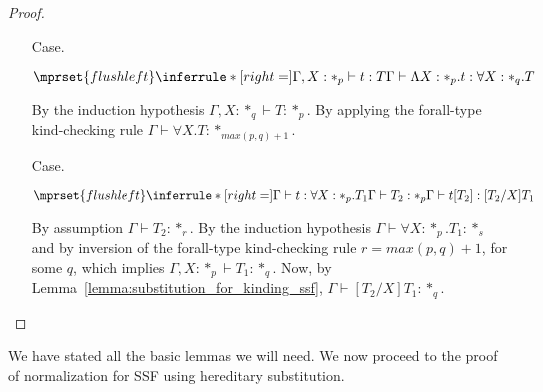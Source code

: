 \begin{proof}
\begin{itemize}
\item[Case.] \ \\
  \begin{center}
    \begin{math}
      $$\mprset{flushleft}
      \inferrule* [right=] {
        \Gamma, X : *_p \vdash t : T
      }{\Gamma \vdash \Lambda X:*_p.t:\forall X : *_q.T}
    \end{math}
  \end{center}
  By the induction hypothesis $\Gamma,X:*_q \vdash T:*_p$.  By applying
  the forall-type kind-checking rule $\Gamma \vdash \forall X.T:*_{max(p,q)+1}$.
  
\item[Case.] \ \\
  \begin{center}
    \begin{math}
      $$\mprset{flushleft}
      \inferrule* [right=] {
        \Gamma \vdash t:\forall X:*_p.T_1
        \\
        \Gamma \vdash T_2:*_p
      }{\Gamma \vdash t[T_2]: [T_2/X]T_1}
    \end{math}
  \end{center}
  By assumption $\Gamma \vdash T_2:*_r$.  By the induction hypothesis 
  $\Gamma \vdash \forall X:*_p.T_1:*_s$ and by inversion of the forall-type
  kind-checking rule $r = max(p,q)+1$, for some $q$, which implies 
  $\Gamma,X:*_p \vdash T_1:*_q$.  Now, by Lemma~\ref{lemma:substitution_for_kinding_ssf},
  $\Gamma \vdash [T_2/X]T_1:*_q$.
\end{itemize}
\end{proof}
\noindent
We have stated all the basic lemmas we will need.  We now proceed to
the proof of normalization for SSF using hereditary substitution.

